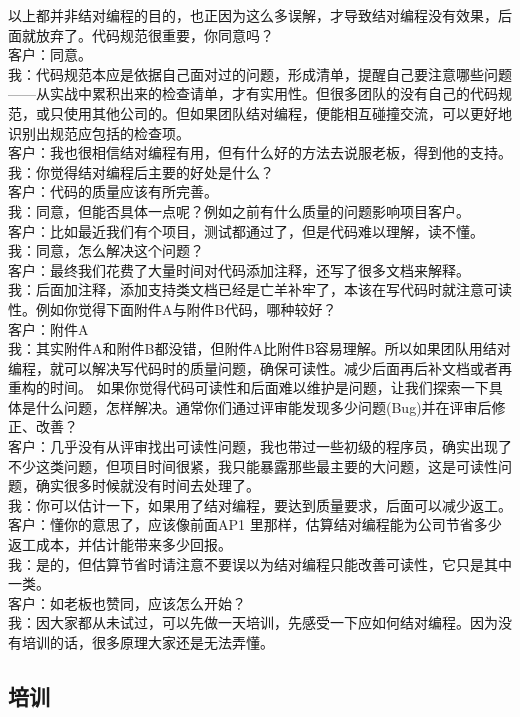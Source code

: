 以上都并非结对编程的目的，也正因为这么多误解，才导致结对编程没有效果，后面就放弃了。代码规范很重要，你同意吗？\\
客户：同意。\\
我：代码规范本应是依据自己面对过的问题，形成清单，提醒自己要注意哪些问题------从实战中累积出来的检查请单，才有实用性。但很多团队的没有自己的代码规范，或只使用其他公司的。但如果团队结对编程，便能相互碰撞交流，可以更好地识别出规范应包括的检查项。\\
客户：我也很相信结对编程有用，但有什么好的方法去说服老板，得到他的支持。\\
我：你觉得结对编程后主要的好处是什么？\\
客户：代码的质量应该有所完善。\\
我：同意，但能否具体一点呢？例如之前有什么质量的问题影响项目客户。\\
客户：比如最近我们有个项目，测试都通过了，但是代码难以理解，读不懂。\\
我：同意，怎么解决这个问题？\\
客户：最终我们花费了大量时间对代码添加注释，还写了很多文档来解释。\\
我：后面加注释，添加支持类文档已经是亡羊补牢了，本该在写代码时就注意可读性。例如你觉得下面附件A与附件B代码，哪种较好？\\
客户：附件A\\
我：其实附件A和附件B都没错，但附件A比附件B容易理解。所以如果团队用结对编程，就可以解决写代码时的质量问题，确保可读性。减少后面再后补文档或者再重构的时间。
如果你觉得代码可读性和后面难以维护是问题，让我们探索一下具体是什么问题，怎样解决。通常你们通过评审能发现多少问题(Bug)并在评审后修正、改善？\\
客户：几乎没有从评审找出可读性问题，我也带过一些初级的程序员，确实出现了不少这类问题，但项目时间很紧，我只能暴露那些最主要的大问题，这是可读性问题，确实很多时候就没有时间去处理了。\\
我：你可以估计一下，如果用了结对编程，要达到质量要求，后面可以减少返工。\\
客户：懂你的意思了，应该像前面AP1
里那样，估算结对编程能为公司节省多少返工成本，并估计能带来多少回报。\\
我：是的，但估算节省时请注意不要误以为结对编程只能改善可读性，它只是其中一类。\\
客户：如老板也赞同，应该怎么开始？\\
我：因大家都从未试过，可以先做一天培训，先感受一下应如何结对编程。因为没有培训的话，很多原理大家还是无法弄懂。\\

\hypertarget{ux57f9ux8bad}{%
\subsection{培训}\label{ux57f9ux8bad}}

